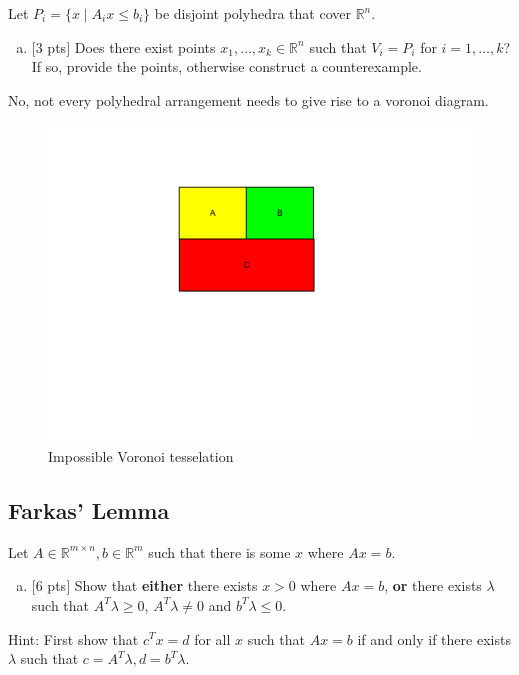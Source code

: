 \documentclass[12pt]{article}
\begin{document}
\vspace{.25cm}

\noindent Let $P_i = \{x \mid A_ix \le b_i\}$ be disjoint polyhedra that cover $\mathbb{R}^n$.
\begin{enumerate}[(c)]
\item
 $[$3 pts$]$  Does there exist points $x_1,\ldots,x_k\in\mathbb{R}^n$ such that $V_i = P_i$ for $i = 1,\ldots,k$?  If so, provide the points, otherwise construct a counterexample.
\end{enumerate}

No, not every polyhedral arrangement needs to give rise to a voronoi diagram. 
\begin{figure}[h!]
  \centering
    \includegraphics[width=\textwidth]{voronoi}
  \caption{Impossible Voronoi tesselation}
\end{figure}

\clearpage

\subsection{Farkas' Lemma}

Let $A\in\mathbb{R}^{m\times n}, b\in\mathbb{R}^m$ such that there is some $x$ where $Ax = b$.

\begin{enumerate}[(a)]
\item
$[$6 pts$]$  Show that {\bf either} there exists $x > 0$ where $Ax = b$, {\bf or} there exists $\lambda$ such that $A^T\lambda \ge 0$, $A^T\lambda \ne 0$ and $b^T\lambda \le 0$.
\end{enumerate}
Hint: First show that $c^Tx = d$ for all $x$ such that $Ax = b$ if and only if there exists $\lambda$ such that $c= A^T\lambda, d=b^T\lambda$.
\end{document}
